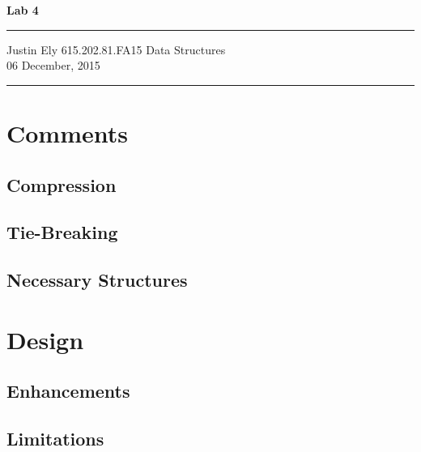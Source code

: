 \documentclass[a4paper,12pt]{article}
\begin{document}
\begin{flushright}

\vspace{1.1cm}

{\bf\Huge Lab 4}

\rule{0.25\linewidth}{0.5pt}

\vspace{0.5cm}
Justin Ely
\linebreak
\newline
\footnotesize{615.202.81.FA15 Data Structures \\}
\vspace{0.5cm}
06 December, 2015
\end{flushright}

\noindent\rule{\linewidth}{1.0pt}


\section{Comments}

\subsection{Compression}


\subsection{Tie-Breaking}


\subsection{Necessary Structures}



\section{Design}


\subsection{Enhancements}


\subsection{Limitations}
\end{document}
